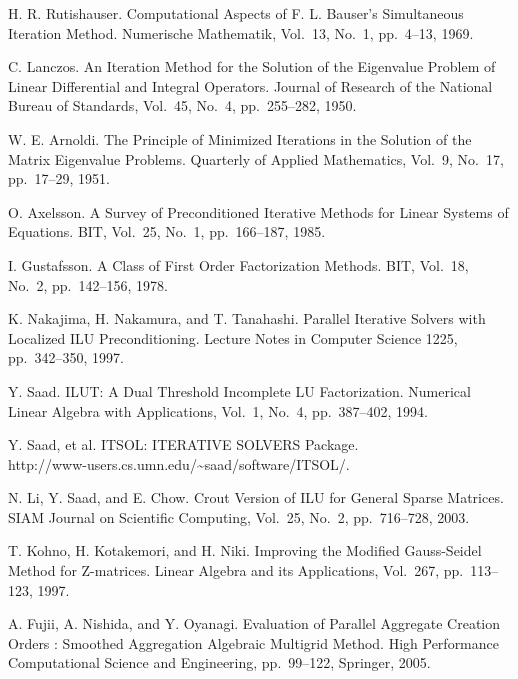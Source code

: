 \documentclass[a4paper]{article}
\begin{document}
\begin{thebibliography}{10}
H. R. Rutishauser.
\newblock Computational Aspects of F. L. Bauser's Simultaneous Iteration
	Method.
\newblock Numerische Mathematik, Vol.~13, No.~1, pp.\ 4--13, 1969.

C. Lanczos.
\newblock An Iteration Method for the Solution of the Eigenvalue Problem
	of Linear Differential and Integral Operators.
\newblock Journal of Research of the National Bureau of Standards, Vol.~45, No.~4, pp.\ 255--282, 1950.

W. E. Arnoldi.
\newblock The Principle of Minimized Iterations in the Solution of the Matrix Eigenvalue Problems.
\newblock Quarterly of Applied Mathematics, Vol.~9, No.~17, pp.\ 17--29, 1951.

O. Axelsson.
\newblock A Survey of Preconditioned Iterative Methods for Linear
	Systems of Equations.
\newblock BIT, Vol.~25, No.~1, pp.\ 166--187, 1985.

I. Gustafsson.
\newblock A Class of First Order Factorization Methods.
\newblock BIT, Vol.~18, No.~2, pp.\ 142--156, 1978.

K. Nakajima, H. Nakamura, and T. Tanahashi.
\newblock Parallel Iterative Solvers with Localized ILU Preconditioning.
\newblock Lecture Notes in Computer Science 1225, pp.\ 342--350, 1997.

Y. Saad.
\newblock ILUT: A Dual Threshold Incomplete LU Factorization.
\newblock Numerical Linear Algebra with Applications, Vol.~1, No.~4, pp.\ 387--402, 1994. 

Y. Saad, et al.
\newblock ITSOL: ITERATIVE SOLVERS Package. \\
\newblock http://www-users.cs.umn.edu/\textasciitilde saad/software/ITSOL/.

N. Li, Y. Saad, and E. Chow.
\newblock Crout Version of ILU for General Sparse Matrices.
\newblock SIAM Journal on Scientific Computing, Vol.~25, No.~2, pp.\ 716--728, 2003. 

T. Kohno, H. Kotakemori, and H. Niki.
\newblock Improving the Modified Gauss-Seidel Method for Z-matrices.
\newblock Linear Algebra and its Applications, Vol.~267, pp.\ 113--123, 1997.

A. Fujii, A. Nishida, and Y. Oyanagi.
\newblock Evaluation of Parallel Aggregate Creation Orders : Smoothed Aggregation Algebraic Multigrid Method.
\newblock High Performance Computational Science and Engineering, pp.\ 99--122, Springer, 2005. 


\end{thebibliography}
\end{document}
